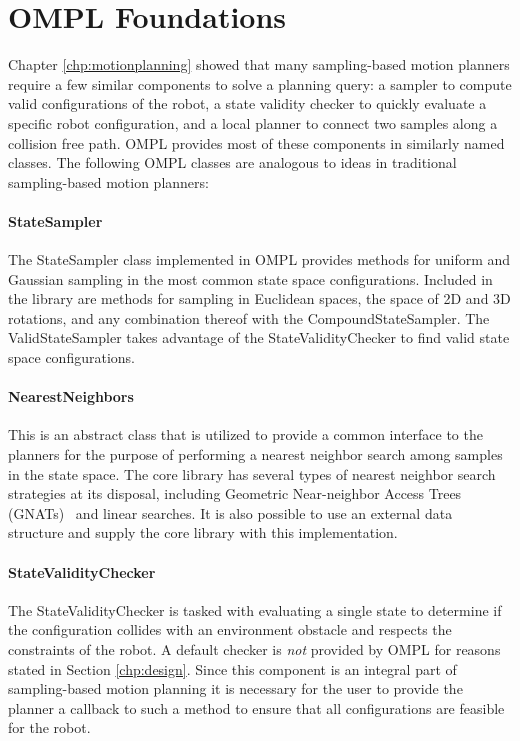 \section {OMPL Foundations}
Chapter \ref{chp:motionplanning} showed that many sampling-based motion planners
require a few similar components to solve a planning query: a sampler to compute
valid configurations of the robot, a state validity checker to quickly evaluate
a specific robot configuration, and a local planner to connect two samples along
a collision free path.  OMPL provides most of these components in similarly
named classes.  The following OMPL classes are analogous to ideas in traditional
sampling-based motion planners:

\paragraph {StateSampler} The StateSampler class implemented in OMPL
provides methods for uniform and Gaussian sampling in the most common state
space configurations.  Included in the library are methods for sampling
in Euclidean spaces, the space of 2D and 3D rotations, and any combination
thereof with the CompoundStateSampler.  The ValidStateSampler takes advantage
of the StateValidityChecker to find valid state space configurations.

\paragraph {NearestNeighbors} This is an abstract class that is utilized
to provide a common interface to the planners for the purpose of performing a
nearest neighbor search among samples in the state space.  The core library
has several types of nearest neighbor search strategies at its disposal,
including Geometric Near-neighbor Access Trees (GNATs)~\cite{Brin:1995}
and linear searches.
It is also possible to use an external data structure and supply the core library
with this implementation.

\paragraph {StateValidityChecker} The StateValidityChecker is tasked with
evaluating a single state to determine if the configuration collides with an
environment obstacle and respects the constraints of the robot.  A default
checker is \emph{not} provided by OMPL for reasons stated in Section
\ref{chp:design}.  Since this component is an integral part of sampling-based
motion planning it is necessary for the user to provide the planner a callback
to such a method to ensure that all configurations are feasible for the robot.

